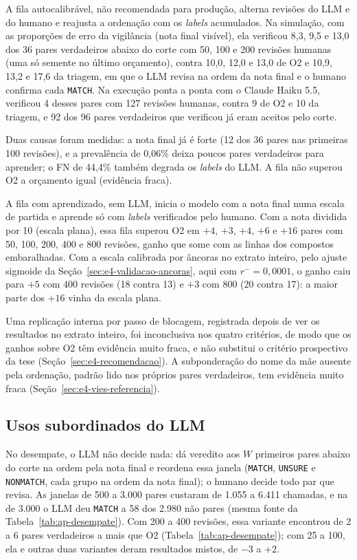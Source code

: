 A fila autocalibrável, não recomendada para produção, alterna revisões do LLM e do humano e reajusta a ordenação com os \textit{labels} acumulados. Na simulação, com as proporções de erro da vigilância (nota final visível), ela verificou 8,3, 9,5 e 13,0 dos 36 pares verdadeiros abaixo do corte com 50, 100 e 200 revisões humanas (uma só semente no último orçamento), contra 10,0, 12,0 e 13,0 de O2 e 10,9, 13,2 e 17,6 da triagem, em que o LLM revisa na ordem da nota final e o humano confirma cada \texttt{MATCH}. Na execução ponta a ponta com o Claude Haiku 5.5, verificou 4 desses pares com 127 revisões humanas, contra 9 de O2 e 10 da triagem, e 92 dos 96 pares verdadeiros que verificou já eram aceitos pelo corte.

Duas causas foram medidas: a nota final já é forte (12 dos 36 pares nas primeiras 100 revisões), e a prevalência de 0,06\% deixa poucos pares verdadeiros para aprender; o FN de 44,4\% também degrada os \textit{labels} do LLM. A fila não superou O2 a orçamento igual (evidência fraca).

A fila com aprendizado, sem LLM, inicia o modelo com a nota final numa escala de partida e aprende só com \textit{labels} verificados pelo humano. Com a nota dividida por 10 (escala plana), essa fila superou O2 em $+4$, $+3$, $+4$, $+6$ e $+16$ pares com 50, 100, 200, 400 e 800 revisões, ganho que some com as linhas dos compostos embaralhadas. Com a escala calibrada por âncoras no extrato inteiro, pelo ajuste sigmoide da Seção~\ref{sec:e4-validacao-ancoras}, aqui com $r^-=0{,}0001$, o ganho caiu para $+5$ com 400 revisões (18 contra 13) e $+3$ com 800 (20 contra 17): a maior parte dos $+16$ vinha da escala plana.

Uma replicação interna por passo de blocagem, registrada depois de ver os resultados no extrato inteiro, foi inconclusiva nos quatro critérios, de modo que os ganhos sobre O2 têm evidência muito fraca, e não substitui o critério prospectivo da tese (Seção~\ref{sec:e4-recomendacao}). A subponderação do nome da mãe ausente pela ordenação, padrão lido nos próprios pares verdadeiros, tem evidência muito fraca (Seção~\ref{sec:e4-vies-referencia}).

\subsection{Usos subordinados do LLM}\label{sec:e4-ap-desempate}

No desempate, o LLM não decide nada: dá veredito aos $W$ primeiros pares abaixo do corte na ordem pela nota final e reordena essa janela (\texttt{MATCH}, \texttt{UNSURE} e \texttt{NONMATCH}, cada grupo na ordem da nota final); o humano decide todo par que revisa. As janelas de 500 a 3.000 pares custaram de 1.055 a 6.411 chamadas, e na de 3.000 o LLM deu \texttt{MATCH} a 58 dos 2.980 não pares (mesma fonte da Tabela~\ref{tab:ap-desempate}). Com 200 a 400 revisões, essa variante encontrou de 2 a 6 pares verdadeiros a mais que O2 (Tabela~\ref{tab:ap-desempate}); com 25 a 100, ela e outras duas variantes deram resultados mistos, de $-3$ a $+2$.

